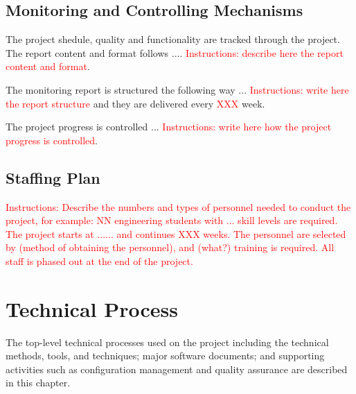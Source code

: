 \documentclass{article}
\begin{document}
\subsection{Monitoring and Controlling Mechanisms}
The project shedule, quality and functionality are tracked through the project. The
report content and format follows .... \textcolor{red}{Instructions: describe here the report content and format}.

\vspace{0.5cm}

The monitoring report is structured the following way ... \textcolor{red}{ Instructions: write here
the report structure} and they are delivered every  \textcolor{red}{XXX} week.

\vspace{0.5cm}

The project progress is controlled ... \textcolor{red}{Instructions: write here how the project progress is controlled}.

\subsection{Staffing Plan}

\textcolor{red}{Instructions: Describe the numbers and types of personnel needed to conduct the
project, for example: NN engineering students with ... skill levels are required.
The project starts at ...... and continues XXX weeks. The personnel are selected
by (method of obtaining the personnel), and (what?) training is required. All staff
is phased out at the end of the project.}

\section{Technical Process}
The top-level technical processes used on the project including the technical
methods, tools, and techniques; major software documents; and supporting
activities such as configuration management and quality assurance are described
in this chapter.
\end{document}
